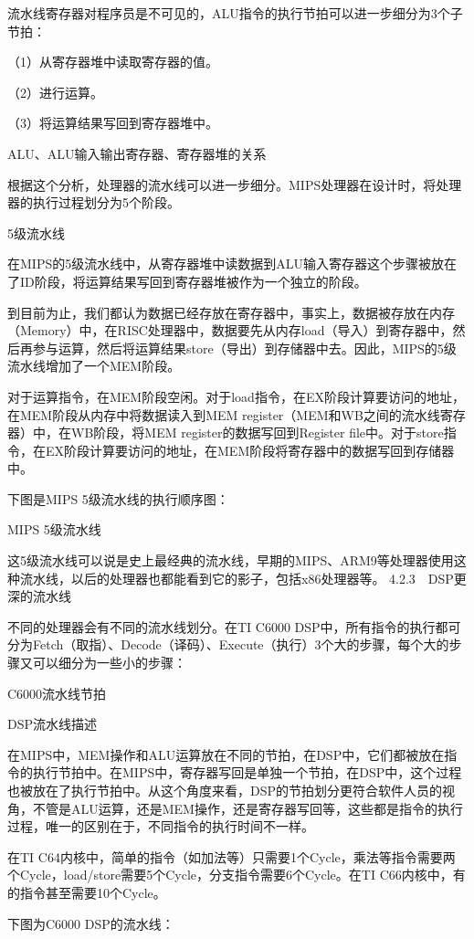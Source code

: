 \documentclass[12pt,UTF8]{ctexbook}
\begin{document}
流水线寄存器对程序员是不可见的，ALU指令的执行节拍可以进一步细分为3个子节拍：

（1）从寄存器堆中读取寄存器的值。

（2）进行运算。

（3）将运算结果写回到寄存器堆中。

ALU、ALU输入输出寄存器、寄存器堆的关系

根据这个分析，处理器的流水线可以进一步细分。MIPS处理器在设计时，将处理器的执行过程划分为5个阶段。

5级流水线

在MIPS的5级流水线中，从寄存器堆中读数据到ALU输入寄存器这个步骤被放在了ID阶段，将运算结果写回到寄存器堆被作为一个独立的阶段。

到目前为止，我们都认为数据已经存放在寄存器中，事实上，数据被存放在内存（Memory）中，在RISC处理器中，数据要先从内存load（导入）到寄存器中，然后再参与运算，然后将运算结果store（导出）到存储器中去。因此，MIPS的5级流水线增加了一个MEM阶段。

对于运算指令，在MEM阶段空闲。对于load指令，在EX阶段计算要访问的地址，在MEM阶段从内存中将数据读入到MEM register（MEM和WB之间的流水线寄存器）中，在WB阶段，将MEM register的数据写回到Register file中。对于store指令，在EX阶段计算要访问的地址，在MEM阶段将寄存器中的数据写回到存储器中。

下图是MIPS 5级流水线的执行顺序图：

MIPS 5级流水线

这5级流水线可以说是史上最经典的流水线，早期的MIPS、ARM9等处理器使用这种流水线，以后的处理器也都能看到它的影子，包括x86处理器等。
4.2.3　DSP更深的流水线

不同的处理器会有不同的流水线划分。在TI C6000 DSP中，所有指令的执行都可分为Fetch（取指）、Decode（译码）、Execute（执行）3个大的步骤，每个大的步骤又可以细分为一些小的步骤：

C6000流水线节拍

DSP流水线描述

在MIPS中，MEM操作和ALU运算放在不同的节拍，在DSP中，它们都被放在指令的执行节拍中。在MIPS中，寄存器写回是单独一个节拍，在DSP中，这个过程也被放在了执行节拍中。从这个角度来看，DSP的节拍划分更符合软件人员的视角，不管是ALU运算，还是MEM操作，还是寄存器写回等，这些都是指令的执行过程，唯一的区别在于，不同指令的执行时间不一样。

在TI C64内核中，简单的指令（如加法等）只需要1个Cycle，乘法等指令需要两个Cycle，load/store需要5个Cycle，分支指令需要6个Cycle。在TI C66内核中，有的指令甚至需要10个Cycle。

下图为C6000 DSP的流水线：
\end{document}
